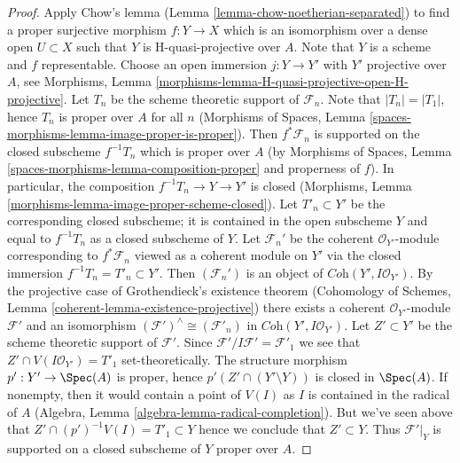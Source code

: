 \begin{proof}
\medskip\noindent
Apply Chow's lemma (Lemma \ref{lemma-chow-noetherian-separated})
to find a proper surjective morphism $f : Y \to X$ which is an isomorphism
over a dense open $U \subset X$ such that $Y$ is H-quasi-projective
over $A$. Note that $Y$ is a scheme and $f$ representable.
Choose an open immersion $j : Y \to Y'$ with $Y'$ projective over $A$, see
Morphisms, Lemma \ref{morphisms-lemma-H-quasi-projective-open-H-projective}.
Let $T_n$ be the scheme theoretic support of $\mathcal{F}_n$.
Note that $|T_n| = |T_1|$, hence $T_n$ is proper over $A$ for all $n$
(Morphisms of Spaces, Lemma
\ref{spaces-morphisms-lemma-image-proper-is-proper}).
Then $f^*\mathcal{F}_n$ is supported on the closed subscheme
$f^{-1}T_n$ which is proper over $A$ (by
Morphisms of Spaces, Lemma \ref{spaces-morphisms-lemma-composition-proper}
and properness of $f$).
In particular, the composition $f^{-1}T_n \to Y \to Y'$ is closed
(Morphisms, Lemma \ref{morphisms-lemma-image-proper-scheme-closed}).
Let $T'_n \subset Y'$ be the corresponding closed subscheme;
it is contained in the open subscheme $Y$ and equal to $f^{-1}T_n$
as a closed subscheme of $Y$. Let $\mathcal{F}_n'$
be the coherent $\mathcal{O}_{Y'}$-module corresponding to
$f^*\mathcal{F}_n$ viewed as a coherent module on $Y'$ via
the closed immersion $f^{-1}T_n = T'_n \subset Y'$.
Then $(\mathcal{F}_n')$
is an object of $\textit{Coh}(Y', I\mathcal{O}_{Y'})$.
By the projective case of Grothendieck's existence theorem
(Cohomology of Schemes, Lemma \ref{coherent-lemma-existence-projective})
there exists a coherent $\mathcal{O}_{Y'}$-module
$\mathcal{F}'$ and an isomorphism
$(\mathcal{F}')^\wedge \cong (\mathcal{F}'_n)$ in
$\textit{Coh}(Y', I\mathcal{O}_{Y'})$.
Let $Z' \subset Y'$ be the scheme theoretic support of $\mathcal{F}'$.
Since $\mathcal{F}'/I\mathcal{F}' = \mathcal{F}'_1$ we see
that $Z' \cap V(I\mathcal{O}_{Y'}) = T'_1$ set-theoretically.
The structure morphism $p' : Y' \to \Spec(A)$ is proper, hence
$p'(Z' \cap (Y' \setminus Y))$ is closed in $\Spec(A)$.
If nonempty, then it would contain a point of $V(I)$
as $I$ is contained in the radical of $A$
(Algebra, Lemma \ref{algebra-lemma-radical-completion}).
But we've seen above that $Z' \cap (p')^{-1}V(I) = T'_1 \subset Y$
hence we conclude that $Z' \subset Y$. Thus $\mathcal{F}'|_Y$
is supported on a closed subscheme of $Y$ proper over $A$.


\end{proof}
